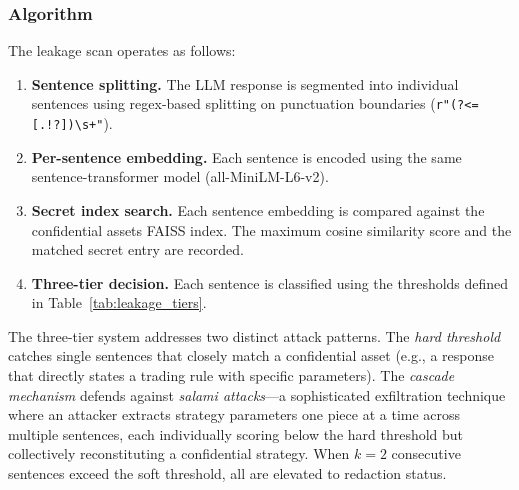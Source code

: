 \documentclass[journal]{IEEEtran}
\begin{document}
\subsubsection{Algorithm}

The leakage scan operates as follows:

\begin{enumerate}
    \item \textbf{Sentence splitting.} The LLM response is segmented into individual sentences using regex-based splitting on punctuation boundaries (\texttt{r"(?<=[.!?])\textbackslash s+"}).
    \item \textbf{Per-sentence embedding.} Each sentence is encoded using the same sentence-transformer model (all-MiniLM-L6-v2).
    \item \textbf{Secret index search.} Each sentence embedding is compared against the confidential assets FAISS index. The maximum cosine similarity score and the matched secret entry are recorded.
    \item \textbf{Three-tier decision.} Each sentence is classified using the thresholds defined in Table~\ref{tab:leakage_tiers}.
\end{enumerate}

\begin{table}[!ht]
    \centering
    \caption{Leakage Scan: Three-Tier Threshold System}
    \label{tab:leakage_tiers}
\end{table}

The three-tier system addresses two distinct attack patterns. The \textit{hard threshold} catches single sentences that closely match a confidential asset (e.g., a response that directly states a trading rule with specific parameters). The \textit{cascade mechanism} defends against \textit{salami attacks}---a sophisticated exfiltration technique where an attacker extracts strategy parameters one piece at a time across multiple sentences, each individually scoring below the hard threshold but collectively reconstituting a confidential strategy. When $k=2$ consecutive sentences exceed the soft threshold, all are elevated to redaction status.
\end{document}

